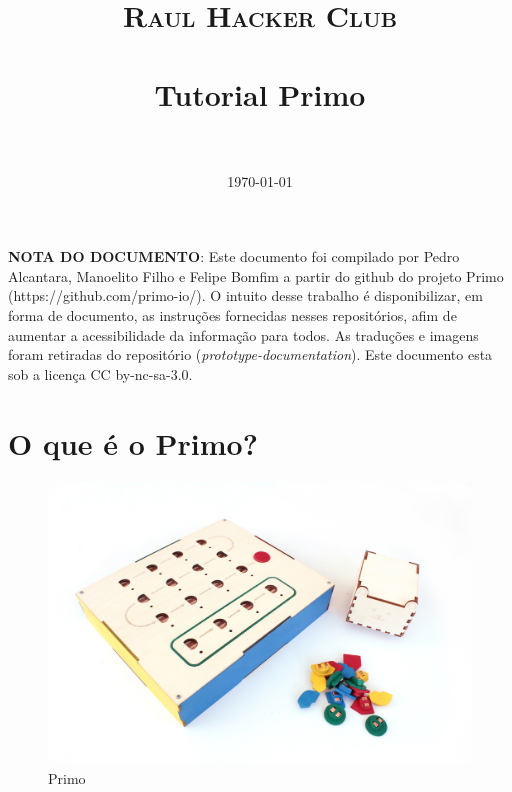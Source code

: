 \documentclass[paper=a4, fontsize=11pt]{scrartcl} %
\title{	
\normalfont \normalsize 
\textsc{Raul Hacker Club} \\ [25pt] %
\horrule{0.5pt} \\[0.4cm] %
\huge Tutorial Primo  \\ %
\horrule{2pt} \\[0.5cm] %
}
\date{\normalsize\today} %
\numberwithin{equation}{section} %
\numberwithin{figure}{section} %
\numberwithin{table}{section} %
\begin{document}
\maketitle %

\setlength{\parindent}{1.3cm}  %
\setlength{\parskip}{0.2cm}  %



\textbf{NOTA DO DOCUMENTO}: Este documento foi compilado por Pedro Alcantara, Manoelito Filho e Felipe Bomfim a partir do github do projeto Primo (https://github.com/primo-io/). O intuito desse trabalho é disponibilizar, em forma de documento, as instruções fornecidas nesses repositórios, afim de aumentar a acessibilidade da informação para todos. As traduções e imagens foram retiradas do repositório (\textit{prototype-documentation}). Este documento esta sob a licença CC by-nc-sa-3.0.

\section{O que é o Primo?}

\begin{figure}[H] %
\centering
\includegraphics[scale=0.35]{./imagens/primo.jpg}
\caption[ ]{Primo}
\end{figure}
\end{document}
